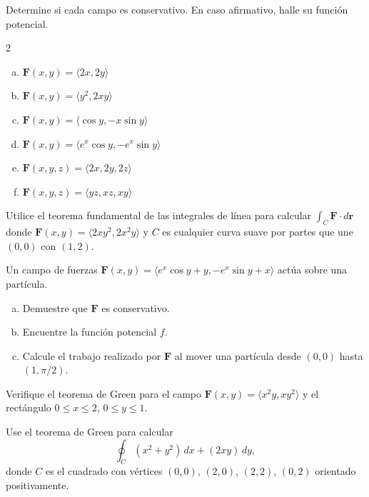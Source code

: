 \begin{prob}
Determine si cada campo es conservativo. En caso afirmativo, halle su
función potencial.
\begin{multicols}{2}
\begin{enumerate}[(a)]
    \item $\mathbf{F}(x,y)=\langle 2x, 2y \rangle$
    \item $\mathbf{F}(x,y)=\langle y^2, 2xy \rangle$
    \item $\mathbf{F}(x,y)=\langle \cos y, -x\sin y \rangle$
    \item $\mathbf{F}(x,y)=\langle e^x \cos y, -e^x \sin y \rangle$
    \item $\mathbf{F}(x,y,z)=\langle 2x, 2y, 2z \rangle$
    \item $\mathbf{F}(x,y,z)=\langle yz, xz, xy \rangle$
\end{enumerate}
\end{multicols}
\end{prob}

\begin{prob}
Utilice el teorema fundamental de las integrales de línea para calcular
$\int_C \mathbf{F}\cdot d\mathbf{r}$ donde $\mathbf{F}(x,y) =
\langle 2xy^2, 2x^2y \rangle$ y $C$ es cualquier curva suave por partes
que une $(0,0)$ con $(1,2)$.
\end{prob}

\begin{prob}
Un campo de fuerzas $\mathbf{F}(x,y) = \langle e^x \cos y + y,
-e^x \sin y + x \rangle$ actúa sobre una partícula.
\begin{enumerate}[(a)]
    \item Demuestre que $\mathbf{F}$ es conservativo.
    \item Encuentre la función potencial $f$.
    \item Calcule el trabajo realizado por $\mathbf{F}$ al mover una
    partícula desde $(0,0)$ hasta $(1,\pi/2)$.
\end{enumerate}
\end{prob}

\begin{prob}
Verifique el teorema de Green para el campo $\mathbf{F}(x,y) =
\langle x^2 y, x y^2 \rangle$ y el rectángulo $0\le x\le 2$,
$0\le y\le 1$.
\end{prob}

\begin{prob}
Use el teorema de Green para calcular
\[
\oint_C (x^2 + y^2)\,dx + (2xy)\,dy,
\]
donde $C$ es el cuadrado con vértices $(0,0)$, $(2,0)$, $(2,2)$,
$(0,2)$ orientado positivamente.
\end{prob}

